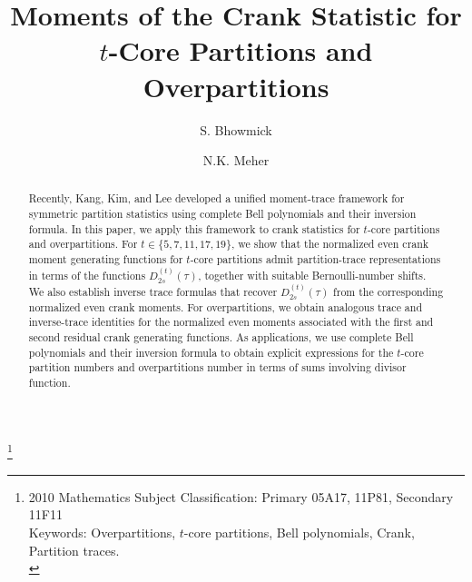 \documentclass[12pt,oneside,reqno]{amsart}
\numberwithin{equation}{section}
\begin{document}
	\title[Moments of the Crank Statistic for 
	$t$-Core Partitions and Overpartitions]  
	{Moments of the Crank Statistic for 
		$t$-Core Partitions and Overpartitions} 
	
	\author[ Sourav Bhowmick]{S. Bhowmick}
	\address{Sourav Bhowmick, Department of Mathematics, National Institute of Technology, Raipur, Chhattisgarh 492010.}
	
	\author[N.K. Meher]{N.K. Meher}
	\address{Nabin Kumar Meher, Department of Mathematics, National Institute of Technology, Raipur, Chhattisgarh 492010.}
	
	
	
	
	
	
	
	
	\thanks{2010 Mathematics Subject Classification: Primary 05A17, 11P81, Secondary 11F11 \\
		Keywords: Overpartitions, $t$-core partitions, Bell polynomials, Crank, Partition traces. \\}
	\maketitle
		\begin{abstract}
			Recently, Kang, Kim, and Lee \cite{Kang2026} developed a unified moment-trace framework for symmetric partition statistics using complete Bell polynomials and their inversion formula. In this paper, we apply this framework to crank statistics for $t$-core partitions and overpartitions. For $t\in\{5,7,11,17,19\}$, we show that the normalized even crank moment generating functions for $t$-core partitions admit partition-trace representations in terms of the functions $D^{(t)}_{2s}(\tau)$, together with suitable Bernoulli-number shifts. We also establish inverse trace formulas that recover $D^{(t)}_{2s}(\tau)$ from the corresponding normalized even crank moments. For overpartitions, we obtain analogous trace and inverse-trace identities for the normalized even moments associated with the first and second residual crank generating functions. As applications, we use complete Bell polynomials and their inversion formula to obtain explicit expressions for the $t$-core partition numbers and overpartitions number in terms of sums involving divisor function.
		
	\end{abstract}
	
\end{document}
